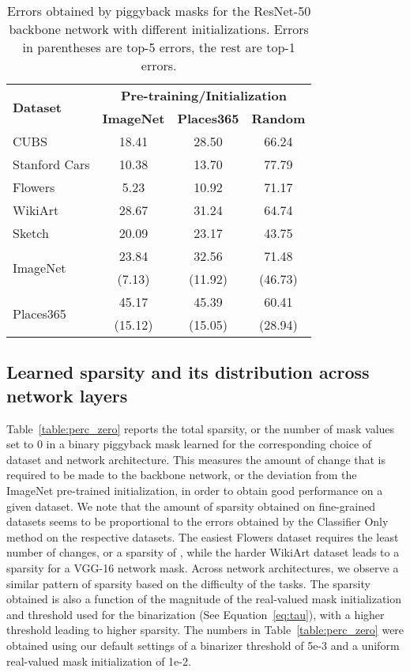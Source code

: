 \documentclass{llncs}
\begin{document}
\begin{table*}[h!]
  \centering
  \begin{tabular}{l||c|c|c}
    \hline
    \multirow{2}{*}{\bf Dataset} & \multicolumn{3}{c}{\bf Pre-training/Initialization}\\
     & {\bf ImageNet} & {\bf Places365} & {\bf Random}\\\hline\hline
    CUBS & 18.41 & 28.50 & 66.24 \\\hline
    Stanford Cars & 10.38 & 13.70 & 77.79 \\\hline
    Flowers & 5.23 & 10.92 & 71.17 \\\hline
    WikiArt & 28.67 & 31.24 & 64.74 \\\hline
    Sketch & 20.09 & 23.17 & 43.75 \\\hline
    \multirow{2}{*}{ImageNet} & {23.84} & 32.56 & 71.48 \\
    & ({7.13}) & (11.92) & (46.73) \\\hline
    \multirow{2}{*}{Places365} & 45.17 & {45.39} & 60.41 \\
    & (15.12) & ({15.05}) & (28.94) \\\hline
  \end{tabular}
  \caption{Errors obtained by piggyback masks for the ResNet-50 backbone network with different initializations. Errors in parentheses are top-5 errors,  the rest are top-1 errors.}
  \label{table:diff_inits}
\end{table*}

\subsection{Learned sparsity and its distribution across network layers}
\label{subsec:sparsity_distribution}
Table~\ref{table:perc_zero} reports the total sparsity, or the number of mask values set to 0 in a binary piggyback mask learned for the corresponding choice of dataset and network architecture. This measures the amount of change that is required to be made to the backbone network, or the deviation from the ImageNet pre-trained initialization, in order to obtain good performance on a given dataset.
We note that the amount of sparsity obtained on fine-grained datasets seems to be proportional to the errors obtained by the Classifier Only method on the respective datasets. The easiest Flowers dataset requires the least number of changes, or a sparsity of , while the harder WikiArt dataset leads to a  sparsity for a VGG-16 network mask. Across network architectures, we observe a similar pattern of sparsity based on the difficulty of the tasks. The sparsity obtained is also a function of the magnitude of the real-valued mask initialization and threshold used for the binarization (See Equation~\ref{eq:tau}), with a higher threshold leading to higher sparsity. The numbers in Table~\ref{table:perc_zero}
were obtained using our default settings of a binarizer threshold of 5e-3 and a uniform real-valued mask initialization of 1e-2.
\end{document}
